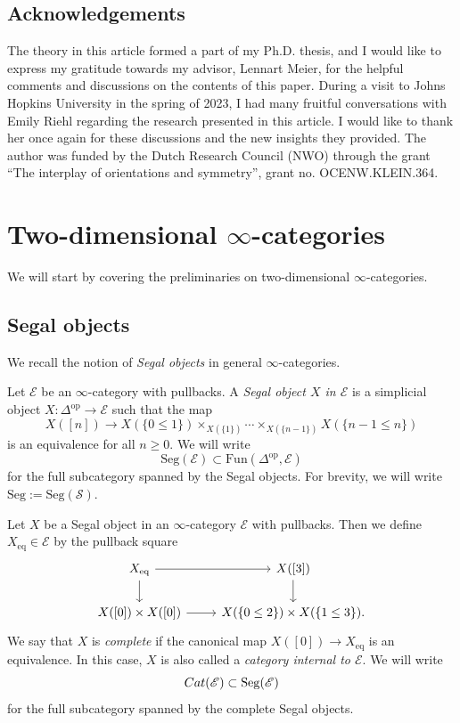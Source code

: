 \documentclass[a4paper, 11pt]{amsart}
\numberwithin{theorem}{section}
\theoremstyle{definition}
\newcommand{\cat}[1]{\textup{#1}}
\newcommand{\op}{\mathrm{op}}
\newcommand{\fun}{\mathrm{Fun}}
\newcommand{\Cat}{\cat{Cat}}
\renewcommand{\S}{\mathscr{S}}
\newcommand{\E}{\mathscr{E}}
\newcommand{\Seg}{\mathrm{Seg}}
\begin{document}
\subsection*{Acknowledgements}

The theory in this article formed a part of my Ph.D. thesis, and  I would like to express my gratitude towards my advisor, Lennart Meier, for the helpful comments and discussions on the contents of this paper.
During a visit to Johns Hopkins University in the spring of 2023, I had many fruitful conversations with Emily Riehl 
regarding the research presented in this article. I would like to thank her once again for these discussions and the new insights they provided.
The author was funded by the Dutch Research Council (NWO) through the grant ``The interplay of orientations and symmetry'', grant no. OCENW.KLEIN.364.

\section{Two-dimensional \texorpdfstring{$\infty$}{∞}-categories}\label{section.prelims}

We will start by covering the preliminaries on two-dimensional $\infty$-categories. 
\subsection{Segal objects}

We recall the notion of \textit{Segal objects} \cite[Definition 1.1.1]{LurieInfty2} in general $\infty$-categories. 

\begin{definition}
	Let $\E$ be an $\infty$-category with pullbacks. 
	A \textit{Segal object $X$ in $\E$} is a simplicial object $X : \Delta^\op \rightarrow \E$
	such that the map
	$$ 
	X([n]) \rightarrow X(\{0 \leq 1\}) \times_{X(\{1\})} \dotsb \times_{X(\{n-1\})} X(\{n-1\leq n\})
	$$ 
	is an equivalence for all $n \geq 0$. We will write $$\Seg(\E) \subset \fun(\Delta^\op, \E)$$ for the full subcategory spanned by the Segal objects. For brevity, we will write 
	$\Seg := \Seg(\S)$.
\end{definition}

\begin{definition}\label{def.comp-cat-obj}
	Let $X$ be a Segal object in an $\infty$-category $\E$ with pullbacks. Then we define $X_\mathrm{eq} \in \E$ by the pullback square
	\[
	\begin{tikzcd}
		X_\mathrm{eq} \arrow[r]\arrow[d] & X([3]) \arrow[d,] \\
		X([0])\times X([0]) \arrow[r] & X(\{0\leq 2\}) \times X(\{1 \leq 3\}).
	\end{tikzcd}
	\]
	We say that $X$ is \textit{complete} if the canonical map $X([0]) \rightarrow X_\mathrm{eq}$ is an equivalence.  
	In this case, $X$ is also called a \textit{category internal to $\E$}. We will write $$\Cat(\E) \subset \Seg(\E)$$ for the full subcategory spanned by the complete Segal objects. 
\end{definition}
\end{document}
